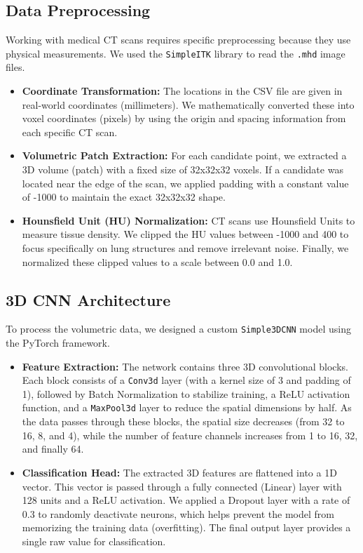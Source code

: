 \documentclass{IEEEtran}
\begin{document}
\subsection{Data Preprocessing}
Working with medical CT scans requires specific preprocessing because they use physical measurements. We used the \texttt{SimpleITK} library to read the \texttt{.mhd} image files.
\begin{itemize}
    \item \textbf{Coordinate Transformation:} The locations in the CSV file are given in real-world coordinates (millimeters). We mathematically converted these into voxel coordinates (pixels) by using the origin and spacing information from each specific CT scan.
    \item \textbf{Volumetric Patch Extraction:} For each candidate point, we extracted a 3D volume (patch) with a fixed size of 32x32x32 voxels. If a candidate was located near the edge of the scan, we applied padding with a constant value of -1000 to maintain the exact 32x32x32 shape.
    \item \textbf{Hounsfield Unit (HU) Normalization:} CT scans use Hounsfield Units to measure tissue density. We clipped the HU values between -1000 and 400 to focus specifically on lung structures and remove irrelevant noise. Finally, we normalized these clipped values to a scale between 0.0 and 1.0.
\end{itemize}

\subsection{3D CNN Architecture}
To process the volumetric data, we designed a custom \texttt{Simple3DCNN} model using the PyTorch framework. 
\begin{itemize}
    \item \textbf{Feature Extraction:} The network contains three 3D convolutional blocks. Each block consists of a \texttt{Conv3d} layer (with a kernel size of 3 and padding of 1), followed by Batch Normalization to stabilize training, a ReLU activation function, and a \texttt{MaxPool3d} layer to reduce the spatial dimensions by half. As the data passes through these blocks, the spatial size decreases (from 32 to 16, 8, and 4), while the number of feature channels increases from 1 to 16, 32, and finally 64.
    \item \textbf{Classification Head:} The extracted 3D features are flattened into a 1D vector. This vector is passed through a fully connected (Linear) layer with 128 units and a ReLU activation. We applied a Dropout layer with a rate of 0.3 to randomly deactivate neurons, which helps prevent the model from memorizing the training data (overfitting). The final output layer provides a single raw value for classification.
\end{itemize}
\end{document}
